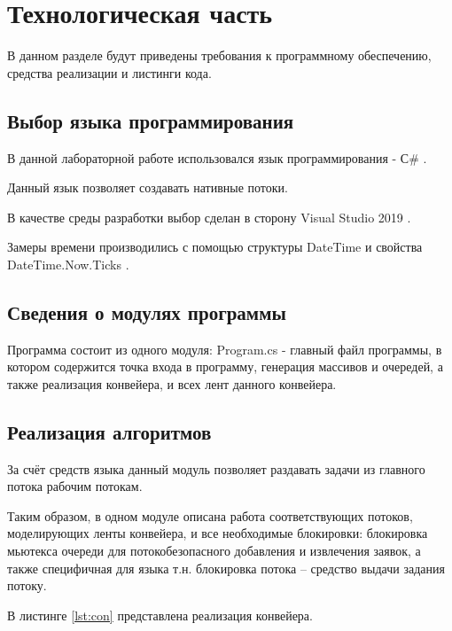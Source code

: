 \chapter{Технологическая часть}
В данном разделе будут приведены требования к программному обеспечению, средства реализации и листинги кода.

\section{Выбор языка программирования}

В данной лабораторной работе использовался язык программирования - С\# \cite{csharplang}.

Данный язык позволяет создавать нативные потоки.

В качестве среды разработки выбор сделан в сторону Visual Studio 2019 \cite{wind}. 

Замеры времени производились с помощью структуры DateTime \cite{csharplang1} и свойства DateTime.Now.Ticks \cite{csharplang2}.

\section{Сведения о модулях программы}
Программа состоит из одного модуля: Program.cs - главный файл программы, в котором содержится точка входа в программу, генерация массивов и очередей, а также реализация конвейера, и всех лент данного конвейера.

\section{Реализация алгоритмов}

За счёт средств языка данный модуль позволяет раздавать задачи из главного потока рабочим потокам. 

Таким образом, в одном модуле описана работа соответствующих потоков, моделирующих ленты конвейера, и все необходимые блокировки: блокировка мьютекса очереди для потокобезопасного добавления и извлечения заявок, а также специфичная для языка т.н. блокировка потока -- средство выдачи задания потоку.


В листинге \ref{lst:con} представлена реализация конвейера.

